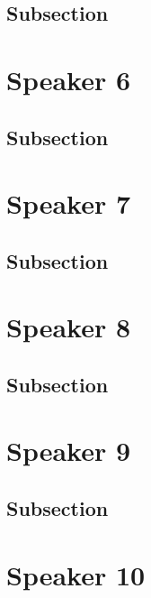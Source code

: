 \documentclass[
]{book}
\begin{document}
\hypertarget{subsection}{%
\section{Subsection}\label{subsection}}

\hypertarget{speaker-6}{%
\chapter*{Speaker 6}\label{speaker-6}}

\hypertarget{subsection}{%
\section{Subsection}\label{subsection}}

\hypertarget{speaker-7}{%
\chapter*{Speaker 7}\label{speaker-7}}

\hypertarget{subsection}{%
\section{Subsection}\label{subsection}}

\hypertarget{speaker-8}{%
\chapter*{Speaker 8}\label{speaker-8}}

\hypertarget{subsection}{%
\section{Subsection}\label{subsection}}

\hypertarget{speaker-9}{%
\chapter*{Speaker 9}\label{speaker-9}}

\hypertarget{subsection}{%
\section{Subsection}\label{subsection}}

\hypertarget{speaker-10}{%
\chapter*{Speaker 10}\label{speaker-10}}
\end{document}
